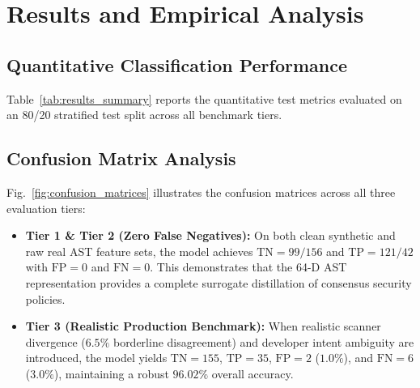 \documentclass[conference]{IEEEtran}
\begin{document}
\section{Results and Empirical Analysis}

\subsection{Quantitative Classification Performance}
Table~\ref{tab:results_summary} reports the quantitative test metrics evaluated on an 80/20 stratified test split across all benchmark tiers.

\begin{table}[htbp]
\caption{Performance Evaluation Across Benchmark Tiers}
\label{tab:results_summary}
\centering
{}
\end{table}

\subsection{Confusion Matrix Analysis}
Fig.~\ref{fig:confusion_matrices} illustrates the confusion matrices across all three evaluation tiers:
\begin{itemize}
    \item \textbf{Tier 1 \& Tier 2 (Zero False Negatives):} On both clean synthetic and raw real AST feature sets, the model achieves $\text{TN} = 99 / 156$ and $\text{TP} = 121 / 42$ with $\text{FP} = 0$ and $\text{FN} = 0$. This demonstrates that the 64-D AST representation provides a complete surrogate distillation of consensus security policies.
    \item \textbf{Tier 3 (Realistic Production Benchmark):} When realistic scanner divergence ($6.5\%$ borderline disagreement) and developer intent ambiguity are introduced, the model yields $\text{TN} = 155$, $\text{TP} = 35$, $\text{FP} = 2$ ($1.0\%$), and $\text{FN} = 6$ ($3.0\%$), maintaining a robust $96.02\%$ overall accuracy.
\end{itemize}
\end{document}
